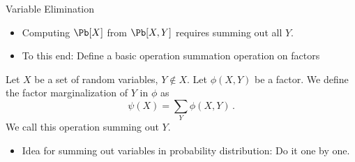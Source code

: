 \begin{frame}{Variable Elimination}
    \begin{itemize}
        \item Computing $\Pb[X]$ from $\Pb[X,Y]$ requires summing out all $Y$.
    \pause \item To this end: Define a basic operation summation operation on factors
    \end{itemize}
    \pause
    \begin{definition}
        Let $X$ be a set of random variables, $Y \notin X$.
        Let $\phi(X,Y)$ be a factor.
        We define the factor marginalization of $Y$ in $\phi$ as 
        \begin{equation}
            \psi(X) = \sum_Y \phi(X,Y)\,.
        \end{equation}
        We call this operation summing out $Y$.
    \end{definition}
    \pause
\begin{itemize}
    \item Idea for summing out variables in probability distribution: Do it one by one.
\end{itemize}
    \pause
    \begin{algorithm}[H]
        \caption{Sum-Product Variable Elimination}
        \vspace{-0.1cm}
            \KwOutput{$\Phi$}
        \label{alg:sum-product-variable-elimination}
    \end{algorithm}
\end{frame}

